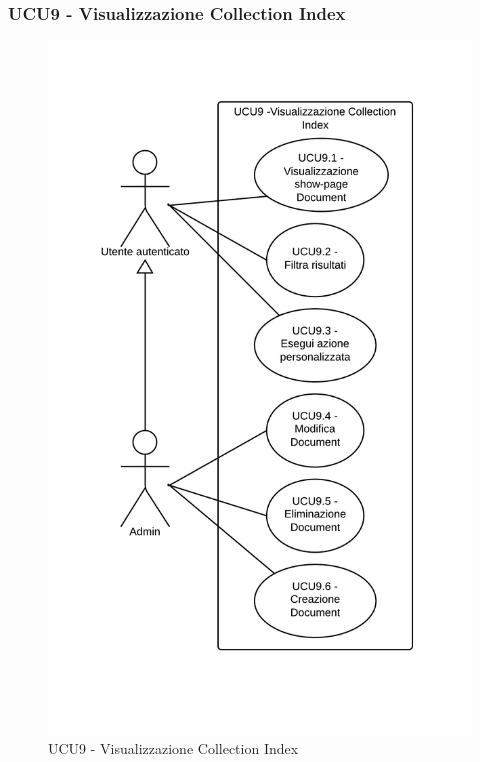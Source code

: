 \subsubsection{UCU9 - Visualizzazione Collection Index} 
    \begin{center}
    \begin{figure}[H]
      \includegraphics[scale=0.16]{UML/UCU9 - Visualizzazione Collection Index.png}
      \caption{UCU9 - Visualizzazione Collection Index} 
    \end{figure}
    \end{center}
    
